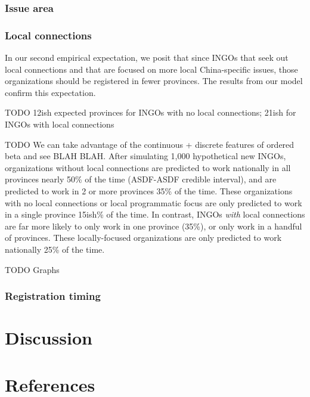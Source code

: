 \documentclass[
]{article}
\begin{document}
\hypertarget{issue-area}{%
\subsubsection{Issue area}\label{issue-area}}

\hypertarget{local-connections}{%
\subsubsection{Local connections}\label{local-connections}}

In our second empirical expectation, we posit that since INGOs that seek
out local connections and that are focused on more local China-specific
issues, those organizations should be registered in fewer provinces. The
results from our model confirm this expectation.

TODO 12ish expected provinces for INGOs with no local connections; 21ish
for INGOs with local connections

TODO We can take advantage of the continuous + discrete features of
ordered beta and see BLAH BLAH. After simulating 1,000 hypothetical new
INGOs, organizations without local connections are predicted to work
nationally in all provinces nearly 50\% of the time (ASDF-ASDF credible
interval), and are predicted to work in 2 or more provinces 35\% of the
time. These organizations with no local connections or local
programmatic focus are only predicted to work in a single province
15ish\% of the time. In contrast, INGOs \emph{with} local connections
are far more likely to only work in one province (35\%), or only work in
a handful of provinces. These locally-focused organizations are only
predicted to work nationally 25\% of the time.

TODO Graphs

\hypertarget{registration-timing}{%
\subsubsection{Registration timing}\label{registration-timing}}

\hypertarget{discussion}{%
\section{Discussion}\label{discussion}}

\hypertarget{references}{%
\section*{References}\label{references}}
\end{document}

